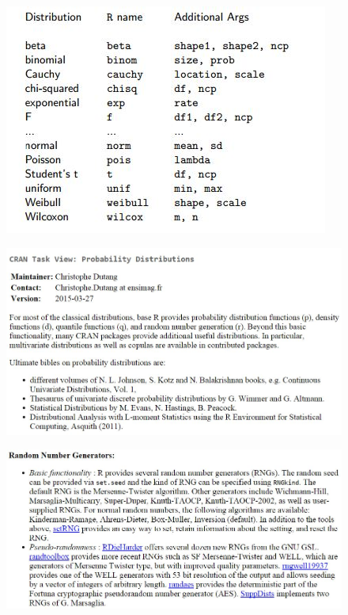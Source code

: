 \documentclass[MAIN.tex]{subfiles}
\begin{document}
\begin{frame}
	\begin{figure}
\centering
\includegraphics[width=0.9\linewidth]{images/stems}
\caption{}
\label{fig:stems}
\end{figure}

	
\end{frame}
\begin{frame}
	\begin{figure}
\centering
\includegraphics[width=1.05\linewidth]{images/CRANTaskview}

\end{figure}
\end{frame}
\begin{frame}
	
\begin{figure}
\centering
\includegraphics[width=0.7\linewidth]{images/CRANrng}
\caption{}
\label{fig:CRANrng}
\end{figure}

\end{frame}
\end{document}
